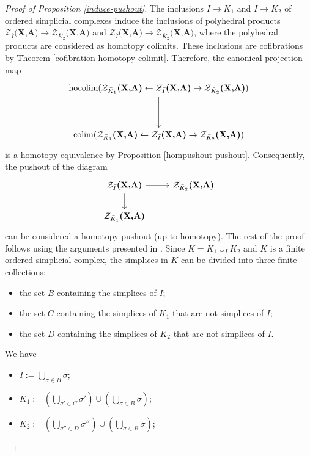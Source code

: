 \documentclass[a4paper,11pt]{article}
\theoremstyle{definition}
\DeclareMathOperator*{\hocolim}{hocolim}
\DeclareMathOperator*{\colim}{colim}
\newcommand{\PP}{\mathcal{P}}
\newcommand{\ZZ}{\mathcal{Z}}
\begin{document}
\begin{proof}[Proof of Proposition \ref{induce-pushout}]
	 The inclusions $I \to K_1$ and $I \to K_2$ of ordered simplicial complexes induce the inclusions of polyhedral products $\ZZ_{\bar I}\textbf{(X,A)} \to \ZZ_{\bar K_2}\textbf{(X,A)}$ and $\ZZ_{\bar I}\textbf{(X,A)} \to \ZZ_{\bar K_2}\textbf{(X,A)}$, where the polyhedral products are considered as homotopy colimits. These inclusions are cofibrations by Theorem \ref{cofibration-homotopy-colimit}. Therefore, the canonical projection map  
	\[\begin{tikzcd}
		{\hocolim(\ZZ_{\bar K_1}\textbf{(X,A)} \leftarrow  \ZZ_{\bar I}\textbf{(X,A)} \rightarrow \ZZ_{\bar K_2}\textbf{(X,A)})} \\
		\\
		{\colim(\ZZ_{\bar K_1}\textbf{(X,A)} \leftarrow  \ZZ_{\bar I}\textbf{(X,A)} \rightarrow \ZZ_{\bar K_2}\textbf{(X,A)})}
		\arrow[from=1-1, to=3-1]
	\end{tikzcd}\]
	is a homotopy equivalence by Proposition \ref{hompushout-pushout}. Consequently, the pushout of the diagram 
	\[
	\begin{tikzcd}
		\ZZ_{\bar I}\textbf{(X,A)} \arrow[r] \arrow[d] & \ZZ_{\bar K_2}\textbf{(X,A)} \\
		\ZZ_{\bar K_1}\textbf{(X,A)}
	\end{tikzcd}
	\] 
    can be considered a homotopy pushout (up to homotopy). The rest of the proof follows using the arguments presented in \cite[Proposition~3.8]{toric-homotopy}. Since $K = K_1 \cup_I K_2$ and $K$ is a finite ordered simplicial complex, the simplices in $K$ can be divided into three finite collections: 
	\begin{itemize}
		\item the set $B$ containing the simplices of $I$;
		\item the set $C$ containing the simplices of $K_1$ that are not simplices of $I$;
		\item the set $D$ containing the simplices of $K_2$ that are not simplices of $I$.
	\end{itemize}
	We have 
	\begin{itemize}
		\item $I := \bigcup_{\sigma \in B} \sigma$;
		\item $K_1 := (\bigcup_{\sigma' \in C} \sigma') \cup (\bigcup_{\sigma \in B} \sigma)$;
		\item $K_2 := (\bigcup_{\sigma'' \in D} \sigma'') \cup (\bigcup_{\sigma \in B} \sigma)$;

\end{itemize}
\end{proof}
\end{document}
